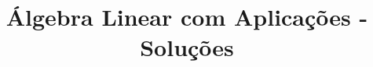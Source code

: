\documentclass[portuguese,12pt,a4paper]{book}
\title{ Álgebra Linear com Aplicações - Soluções}
\begin{document}
\author{}
\maketitle
\tableofcontents












\printbibliography
\end{document}

